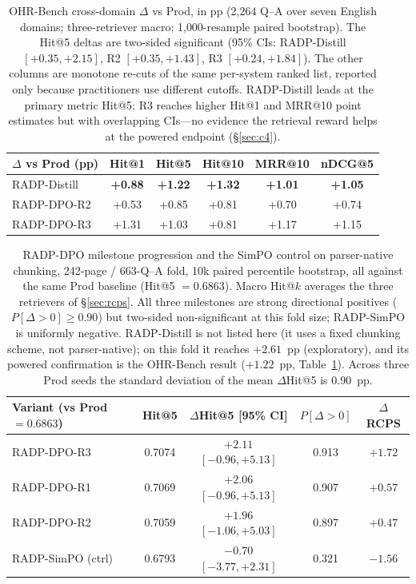 \documentclass[11pt]{article}
\newcommand{\rcps}{\textsc{RCPS}}
\begin{document}
\begin{table}[t]
\centering\small
\setlength{\tabcolsep}{4pt}
\begin{tabular}{lccccc}
\toprule
$\Delta$ vs Prod (pp) & Hit@1 & Hit@5 & Hit@10 & MRR@10 & nDCG@5 \\
\midrule
RADP-Distill & \textbf{+0.88} & \textbf{+1.22} & \textbf{+1.32} & \textbf{+1.01} & \textbf{+1.05} \\
RADP-DPO-R2 & +0.53 & +0.85 & +0.81 & +0.70 & +0.74 \\
RADP-DPO-R3 & +1.31 & +1.03 & +0.81 & +1.17 & +1.15 \\
\bottomrule
\end{tabular}
\caption{OHR-Bench cross-domain $\Delta$ vs Prod, in pp (2{,}264 Q--A over seven English domains; three-retriever macro; 1{,}000-resample paired bootstrap). The Hit@5 deltas are two-sided significant (95\% CIs: RADP-Distill $[+0.35, +2.15]$, R2 $[+0.35, +1.43]$, R3 $[+0.24, +1.84]$). The other columns are monotone re-cuts of the same per-system ranked list, reported only because practitioners use different cutoffs. RADP-Distill leads at the primary metric Hit@5; R3 reaches higher Hit@1 and MRR@10 point estimates but with overlapping CIs---no evidence the retrieval reward helps at the powered endpoint (\S\ref{sec:c4}).}
\label{tab:ohr}
\end{table}

\begin{table}[t]
\centering\small
\setlength{\tabcolsep}{3pt}
\begin{tabular}{lcccc}
\toprule
Variant (vs Prod $=0.6863$) & Hit@5 & $\Delta$Hit@5 [95\% CI] & $P[\Delta{>}0]$ & $\Delta$\rcps{} \\
\midrule
RADP-DPO-R3 & 0.7074 & $+2.11$ $[{-}0.96, {+}5.13]$ & 0.913 & $+1.72$ \\
RADP-DPO-R1 & 0.7069 & $+2.06$ $[{-}0.96, {+}5.13]$ & 0.907 & $+0.57$ \\
RADP-DPO-R2 & 0.7059 & $+1.96$ $[{-}1.06, {+}5.03]$ & 0.897 & $+0.47$ \\
RADP-SimPO (ctrl) & 0.6793 & $-0.70$ $[{-}3.77, {+}2.31]$ & 0.321 & $-1.56$ \\
\bottomrule
\end{tabular}
\caption{RADP-DPO milestone progression and the SimPO control on parser-native chunking, 242-page / 663-Q--A fold, 10k paired percentile bootstrap, all against the same Prod baseline (Hit@5 $= 0.6863$). Macro Hit@$k$ averages the three retrievers of \S\ref{sec:rcps}. All three milestones are strong directional positives ($P[\Delta{>}0] \ge 0.90$) but two-sided non-significant at this fold size; RADP-SimPO is uniformly negative. RADP-Distill is not listed here (it uses a fixed chunking scheme, not parser-native); on this fold it reaches $+2.61$~pp (exploratory), and its powered confirmation is the OHR-Bench result ($+1.22$~pp, Table~\ref{tab:ohr}). Across three Prod seeds the standard deviation of the mean $\Delta$Hit@5 is 0.90~pp.}
\label{tab:kogov}
\end{table}
\end{document}
